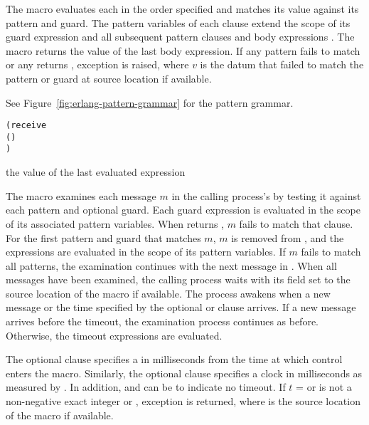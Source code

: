 The  macro evaluates each  in the order
specified and matches its value against its pattern and guard.  The
pattern variables of each clause extend the scope of its guard
expression  and all subsequent pattern clauses and body
expressions   \etc{}.  The  macro
returns the value of the last body expression.  If any pattern fails
to match or any  returns , exception
 is raised, where $v$ is the datum
that failed to match the pattern or guard at source location 
if available.

See Figure~\ref{fig:erlang-pattern-grammar} for the pattern grammar.

\begin{syntax}
  \begin{alltt}
(receive
  (    \etc{})
  \etc{})\strut\end{alltt}
\end{syntax}
\returns{} the value of the last evaluated expression

The  macro examines each message $m$ in the calling
process's  by testing it against each pattern and
optional guard. Each guard expression  is evaluated in the
scope of its associated pattern variables.  When  returns
, $m$ fails to match that clause.  For the first pattern
and guard that matches $m$, $m$ is removed from , and
the expressions   \etc{} are evaluated in the scope of
its pattern variables.  If $m$ fails to match all patterns, the
examination continues with the next message in . When
all messages have been examined, the calling process waits with its
 field set to the source location of the 
macro if available. The process awakens when a new message or the time
specified by the optional  or  clause
arrives. If a new message arrives before the timeout, the examination
process continues as before. Otherwise, the timeout expressions
  \etc{} are evaluated.

The optional  clause specifies a  in
milliseconds from the time at which control enters the
 macro.  Similarly, the optional 
clause specifies a clock  in milliseconds as measured by
.  In addition,  and  can be
 to indicate no timeout. If $t$ =  or
 is not a non-negative exact integer or ,
exception  is returned, where
 is the source location of the  macro if
available.

